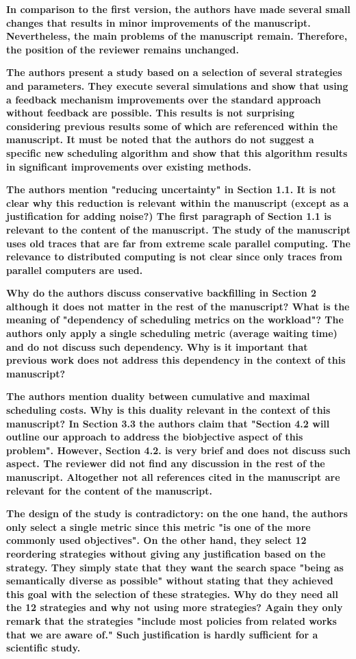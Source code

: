 \documentclass[]{article}
\begin{document}
\textbf{In comparison to the first version, the authors have made several small changes that results in minor improvements of
the manuscript. Nevertheless, the main problems of the manuscript remain. Therefore, the position of the reviewer
remains unchanged.
}

\textbf{The authors present a study based on a selection of several strategies and parameters. They execute several simulations
and show that using a feedback mechanism improvements over the standard approach without feedback are possible. This
results is not surprising considering previous results some of which are referenced within the manuscript. It must be
noted that the authors do not suggest a specific new scheduling algorithm and show that this algorithm results in
significant improvements over existing methods.
}

\textbf{The authors mention "reducing uncertainty" in Section 1.1. It is not clear why this reduction is relevant within the
manuscript (except as a justification for adding noise?)
The first paragraph of Section 1.1 is relevant to the content of the manuscript. The study of the manuscript uses old
traces that are far from extreme scale parallel computing. The relevance to distributed computing is not clear since
only traces from parallel computers are used.
}

\textbf{Why do the authors discuss conservative backfilling in Section 2 although it does not matter in the rest of the
manuscript?
What is the meaning of "dependency of scheduling metrics on the workload"? The authors only apply a single scheduling
metric (average waiting time) and do not discuss such dependency. Why is it important that previous work does not
address this dependency in the context of this manuscript?
}

\textbf{The authors mention duality between cumulative and maximal scheduling costs. Why is this duality relevant in the
context of this manuscript? In Section 3.3 the authors claim that "Section 4.2 will outline our approach to address the
biobjective aspect of this problem". However, Section 4.2. is very brief and does not discuss such aspect. The reviewer
did not find any discussion in the rest of the manuscript. Altogether not all references cited in the manuscript are
relevant for the content of the manuscript.
}

\textbf{The design of the study is contradictory: on the one hand, the authors only select a single metric since this metric
"is one of the more commonly used objectives". On the other hand, they select 12 reordering strategies without giving
any justification based on the strategy. They simply state that they want the search space "being as semantically
diverse as possible" without stating that they achieved this goal with the selection of these strategies. Why do they
need all the 12 strategies and why not using more strategies? Again they only remark that the strategies "include most
policies from related works that we are aware of." Such justification is hardly sufficient for a scientific study.
}
\end{document}

